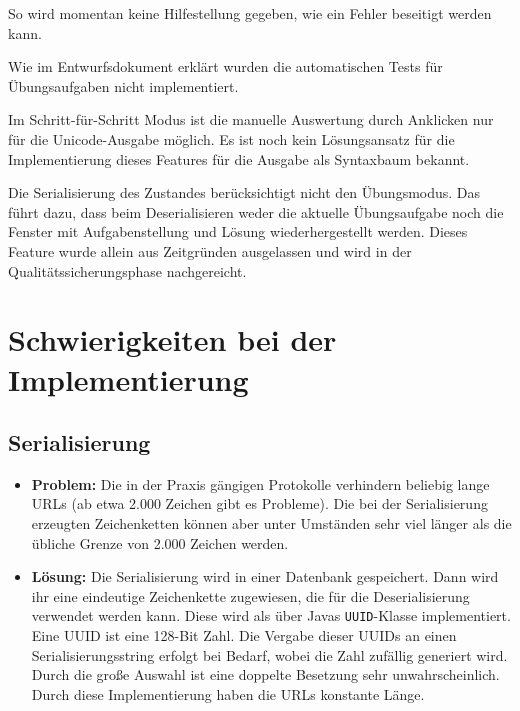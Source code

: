 \documentclass[parskip=full,11pt]{scrartcl}
\begin{document}
So wird momentan keine Hilfestellung gegeben, wie ein Fehler beseitigt werden kann.

Wie im Entwurfsdokument erklärt wurden die automatischen Tests für Übungsaufgaben nicht implementiert.

Im Schritt-für-Schritt Modus ist die manuelle Auswertung durch Anklicken nur für die Unicode-Ausgabe möglich.
Es ist noch kein Lösungsansatz für die Implementierung dieses Features für die Ausgabe als Syntaxbaum bekannt.

Die Serialisierung des Zustandes berücksichtigt nicht den Übungsmodus.
Das führt dazu, dass beim Deserialisieren weder die aktuelle Übungsaufgabe noch die Fenster mit Aufgabenstellung und Lösung wiederhergestellt werden.
Dieses Feature wurde allein aus Zeitgründen ausgelassen und wird in der Qualitätssicherungsphase nachgereicht.

\section{Schwierigkeiten bei der Implementierung}
\subsection{Serialisierung}
\begin{itemize}
\item[] \textbf{Problem:}
Die in der Praxis gängigen Protokolle verhindern beliebig lange URLs (ab etwa 2.000 Zeichen gibt es Probleme).
Die bei der Serialisierung erzeugten Zeichenketten können aber unter Umständen sehr viel länger als die übliche Grenze von 2.000 Zeichen werden.
\item[] \textbf{Lösung:}
Die Serialisierung wird in einer Datenbank gespeichert.
Dann wird ihr eine eindeutige Zeichenkette zugewiesen, die für die Deserialisierung verwendet werden kann.
Diese wird als über Javas \texttt{UUID}-Klasse implementiert.
Eine UUID ist eine 128-Bit Zahl.
Die Vergabe dieser UUIDs an einen Serialisierungsstring erfolgt bei Bedarf, wobei die Zahl zufällig generiert wird.
Durch die große Auswahl ist eine doppelte Besetzung sehr unwahrscheinlich.
Durch diese Implementierung haben die URLs konstante Länge.
\end{itemize}
\end{document}
